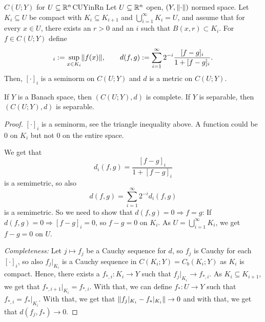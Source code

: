 \documentclass[language=english]{../../Template/TemplateLecture}
\begin{document}
\begin{thm}{$C(U;Y)$ for $U \subseteq \mathbb{R}^n$}{CUYinRn}
    Let $U \subseteq \mathbb{R}^n$ open, $(Y, \lVert\cdot\rVert)$ normed space. Let $K_i \subseteq U$ be compact with $K_i \subseteq K_{i+1}$ and $\bigcup_{i = 1}^\infty K_i = U$, and assume that for every $x \in U$, there exists an $r > 0$ and an $i$ such that $B(x,r) \subset K_i$. For $f \in C(U;Y)$ define 
    \begin{equation}
        [f]_i := \sup_{x \in K_i} \norm{f(x)}, \quad \quad d(f,g) := \sum_{i = 1}^\infty 2^{-i} \frac{[f - g]_i}{1 + [f - g]_i}.
    \end{equation}
    Then, $[\cdot]_i$ is a seminorm on $C(U; Y)$ and $d$ is a metric on $C(U; Y)$.

    If $Y$ is a Banach space, then $(C(U;Y), d)$ is complete. If $Y$ is separable, then $(C(U;Y), d)$ is separable.
\end{thm}
\begin{proof}
    $[\cdot]_i$ is a seminorm, see the triangle inequality above. A function could be $0$ on $K_i$ but not $0$ on the entire space.

    We get that 
    \begin{equation}
        d_i(f,g) = \frac{[f-g]_i}{1 + [f-g]_i}
    \end{equation}
    is a semimetric, so also 
    \begin{equation}
        d(f,g) = \sum_{i = 1}^\infty 2^{-i} d_i(f,g)
    \end{equation}
    is a semimetric. So we need to show that $d(f,g) = 0 \Rightarrow f = g$: If $d(f,g) = 0 \Rightarrow [f-g]_i = 0$, so $f - g = 0$ on $K_i$. As $U = \bigcup_{i = 1}^\infty K_i$, we get $f - g = 0$ on $U$.

    \emph{Completeness:} Let $j \mapsto f_j$ be a Cauchy sequence for $d$, so $f_j$ is Cauchy for each $[\cdot]_i$, so also $f_j|_{K_i}$ is a Cauchy sequence in $C(K_i; Y) = C_b(K_i; Y)$ as $K_i$ is compact. Hence, there exists a $f_{*,i}: K_i \to Y$ such that $f_j|_{K_i} \to f_{*,i}$. As $K_i \subseteq K_{i+1}$, we get that $f_{*,i+1}|_{K_i} = f_{*,i}$. With that, we can define $f_*: U \to Y$ such that $f_{*,i} = f_*|_{K_i}$. With that, we get that $\lVert f_j|_{K_i} - f_*|_{K_i}\rVert \to 0$
    and with that, we get that $d(f_j, f_*) \to 0$.
\end{proof}
\end{document}
